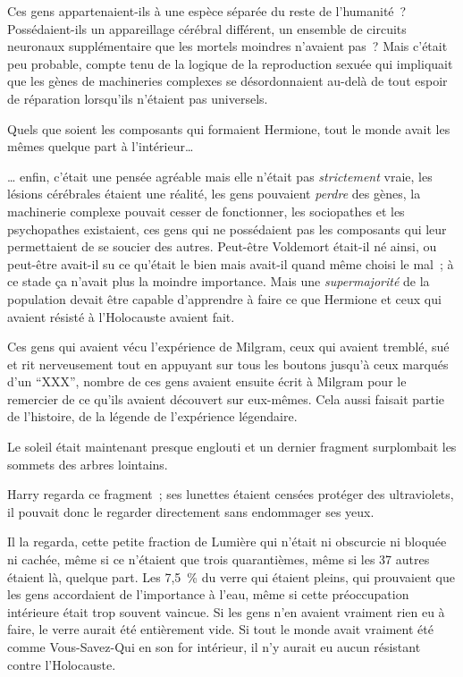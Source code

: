 Ces gens appartenaient-ils à une espèce séparée du reste de l'humanité~? Possédaient-ils un appareillage cérébral différent, un ensemble de circuits neuronaux supplémentaire que les mortels moindres n'avaient pas~? Mais c'était peu probable, compte tenu de la logique de la reproduction sexuée qui impliquait que les gènes de machineries complexes se désordonnaient au-delà de tout espoir de réparation lorsqu'ils n'étaient pas universels.

Quels que soient les composants qui formaient Hermione, tout le monde avait les mêmes quelque part à l'intérieur…

… enfin, c'était une pensée agréable mais elle n'était pas \emph{strictement} vraie, les lésions cérébrales étaient une réalité, les gens pouvaient \emph{perdre} des gènes, la machinerie complexe pouvait cesser de fonctionner, les sociopathes et les psychopathes existaient, ces gens qui ne possédaient pas les composants qui leur permettaient de se soucier des autres. Peut-être Voldemort était-il né ainsi, ou peut-être avait-il su ce qu'était le bien mais avait-il quand même choisi le mal~; à ce stade ça n'avait plus la moindre importance. Mais une \emph{supermajorité} de la population devait être capable d'apprendre à faire ce que Hermione et ceux qui avaient résisté à l'Holocauste avaient fait.

Ces gens qui avaient vécu l'expérience de Milgram, ceux qui avaient tremblé, sué et rit nerveusement tout en appuyant sur tous les boutons jusqu'à ceux marqués d'un “XXX”, nombre de ces gens avaient ensuite écrit à Milgram pour le remercier de ce qu'ils avaient découvert sur eux-mêmes. Cela aussi faisait partie de l'histoire, de la légende de l'expérience légendaire.

Le soleil était maintenant presque englouti et un dernier fragment surplombait les sommets des arbres lointains.

Harry regarda ce fragment~; ses lunettes étaient censées protéger des ultraviolets, il pouvait donc le regarder directement sans endommager ses yeux.

Il la regarda, cette petite fraction de Lumière qui n'était ni obscurcie ni bloquée ni cachée, même si ce n'étaient que trois quarantièmes, même si les 37 autres étaient là, quelque part. Les 7,5~\% du verre qui étaient pleins, qui prouvaient que les gens accordaient de l'importance à l'eau, même si cette préoccupation intérieure était trop souvent vaincue. Si les gens n'en avaient vraiment rien eu à faire, le verre aurait été entièrement vide. Si tout le monde avait vraiment été comme Vous-Savez-Qui en son for intérieur, il n'y aurait eu aucun résistant contre l'Holocauste.

